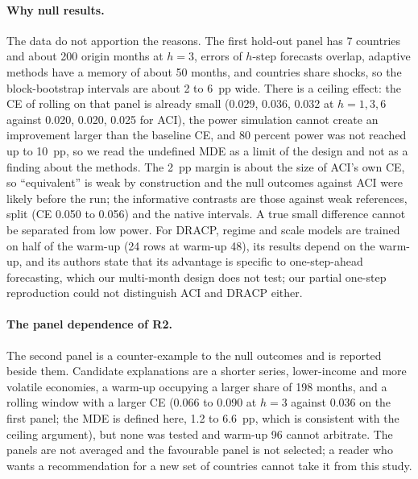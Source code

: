 \paragraph{Why null results.} The data do not apportion the reasons. The first hold-out panel has 7 countries and about 200 origin months at $h=3$, errors of $h$-step forecasts overlap, adaptive methods have a memory of about 50 months, and countries share shocks, so the block-bootstrap intervals are about 2 to 6~pp wide. There is a ceiling effect: the CE of rolling on that panel is already small (0.029, 0.036, 0.032 at $h=1,3,6$ against 0.020, 0.020, 0.025 for ACI), the power simulation cannot create an improvement larger than the baseline CE, and 80 percent power was not reached up to 10~pp, so we read the undefined MDE as a limit of the design and not as a finding about the methods. The 2~pp margin is about the size of ACI's own CE, so ``equivalent'' is weak by construction and the null outcomes against ACI were likely before the run; the informative contrasts are those against weak references, split (CE 0.050 to 0.056) and the native intervals. A true small difference cannot be separated from low power. For DRACP, regime and scale models are trained on half of the warm-up (24 rows at warm-up 48), its results depend on the warm-up, and its authors state that its advantage is specific to one-step-ahead forecasting, which our multi-month design does not test; our partial one-step reproduction could not distinguish ACI and DRACP either.

\paragraph{The panel dependence of R2.} The second panel is a counter-example to the null outcomes and is reported beside them. Candidate explanations are a shorter series, lower-income and more volatile economies, a warm-up occupying a larger share of 198 months, and a rolling window with a larger CE (0.066 to 0.090 at $h=3$ against 0.036 on the first panel; the MDE is defined here, 1.2 to 6.6~pp, which is consistent with the ceiling argument), but none was tested and warm-up 96 cannot arbitrate. The panels are not averaged and the favourable panel is not selected; a reader who wants a recommendation for a new set of countries cannot take it from this study.

